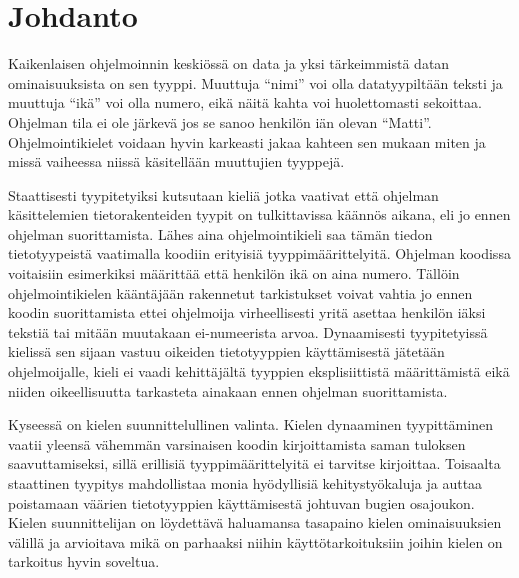 \section{Johdanto}

Kaikenlaisen ohjelmoinnin keskiössä on data ja yksi tärkeimmistä datan
ominaisuuksista on sen tyyppi. Muuttuja “nimi” voi olla datatyypiltään
teksti ja muuttuja “ikä” voi olla numero, eikä näitä kahta voi
huolettomasti sekoittaa. Ohjelman tila ei ole järkevä jos se sanoo
henkilön iän olevan “Matti”. Ohjelmointikielet voidaan hyvin karkeasti
jakaa kahteen sen mukaan miten ja missä vaiheessa niissä käsitellään
muuttujien tyyppejä.

Staattisesti tyypitetyiksi kutsutaan kieliä jotka vaativat että ohjelman
käsittelemien tietorakenteiden tyypit on tulkittavissa käännös aikana,
eli jo ennen ohjelman suorittamista. Lähes aina ohjelmointikieli saa
tämän tiedon tietotyypeistä vaatimalla koodiin erityisiä
tyyppimäärittelyitä. Ohjelman koodissa voitaisiin esimerkiksi määrittää
että henkilön ikä on aina numero. Tällöin ohjelmointikielen kääntäjään
rakennetut tarkistukset voivat vahtia jo ennen koodin suorittamista
ettei ohjelmoija virheellisesti yritä asettaa henkilön iäksi tekstiä tai
mitään muutakaan ei-numeerista arvoa. Dynaamisesti tyypitetyissä
kielissä sen sijaan vastuu oikeiden tietotyyppien käyttämisestä jätetään
ohjelmoijalle, kieli ei vaadi kehittäjältä tyyppien eksplisiittistä
määrittämistä eikä niiden oikeellisuutta tarkasteta ainakaan ennen
ohjelman suorittamista.

Kyseessä on kielen suunnittelullinen valinta. Kielen dynaaminen
tyypittäminen vaatii yleensä vähemmän varsinaisen koodin kirjoittamista
saman tuloksen saavuttamiseksi, sillä erillisiä tyyppimäärittelyitä ei
tarvitse kirjoittaa. Toisaalta staattinen tyypitys mahdollistaa monia
hyödyllisiä kehitystyökaluja ja auttaa poistamaan väärien tietotyyppien
käyttämisestä johtuvan bugien osajoukon. Kielen suunnittelijan on
löydettävä haluamansa tasapaino kielen ominaisuuksien välillä ja
arvioitava mikä on parhaaksi niihin käyttötarkoituksiin joihin kielen on
tarkoitus hyvin soveltua.